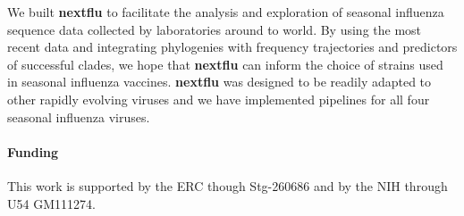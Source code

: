\documentclass{bioinfo}
\newcommand{\nextflu}{\textbf{nextflu}}
\begin{document}
We built \nextflu{} to facilitate the analysis and exploration of seasonal influenza sequence data collected by laboratories around to world.
By using the most recent data and integrating phylogenies with frequency trajectories and predictors of successful clades, we hope that \nextflu{} can inform the choice of strains used in seasonal influenza vaccines. 
\nextflu{} was designed to be readily adapted to other rapidly evolving viruses and we have implemented pipelines for all four seasonal influenza viruses.
 
\paragraph{Funding\textcolon}This work is supported by the ERC though Stg-260686 and by the NIH through U54 GM111274.
\end{document}
